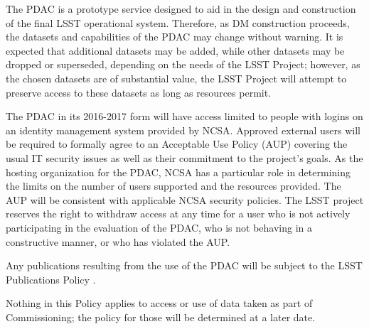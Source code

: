 \documentclass[DM,toc]{lsstdoc}
\begin{document}
The PDAC is a prototype service designed to aid in the design and construction of the final LSST operational system. Therefore, as DM construction proceeds, the datasets and capabilities of the PDAC may change without warning. It is expected that additional datasets may be added, while other datasets may be dropped or superseded, depending on the needs of the LSST Project; however, as the chosen datasets are of substantial value, the LSST Project will attempt to preserve access to these datasets as long as resources permit.

The PDAC in its 2016-2017 form will have access limited to people with logins on an identity management system provided by NCSA. Approved external users will be required to formally agree to an Acceptable Use Policy (AUP) covering the usual IT security issues as well as their commitment to the project's goals. As the hosting organization for the PDAC, NCSA has a particular role in determining the limits on the number of users supported and the resources provided. The AUP will be consistent with applicable NCSA security policies. The LSST project reserves the right to withdraw access at any time for a user who is not actively participating in the evaluation of the PDAC, who is not behaving in a constructive manner, or who has violated the AUP.

Any publications resulting from the use of the PDAC will be subject to the LSST Publications Policy .

Nothing in this Policy applies to access or use of data taken as part of Commissioning; the policy for those will be determined at a later date.


\end{document}
